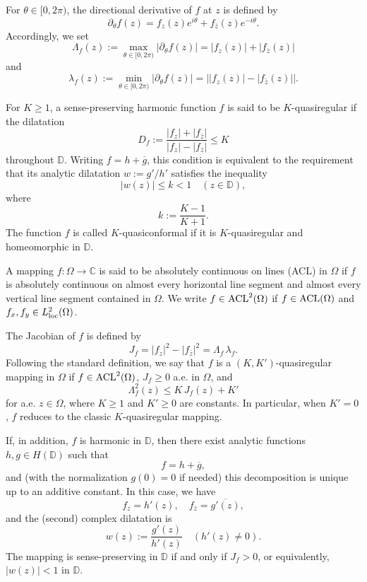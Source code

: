 \documentclass[12pt, reqno]{amsart}
\begin{document}
For $\theta\in[0,2\pi)$, the directional derivative of $f$ at $z$ is defined by
\[
\partial_\theta f(z)
= f_z(z)e^{i\theta}+f_{\bar z}(z)e^{-i\theta}.
\]
Accordingly, we set
\[
\Lambda_f(z):=\max_{\theta\in[0,2\pi)}|\partial_\theta f(z)|
=|f_z(z)|+|f_{\bar z}(z)|
\]
and
\[\lambda_f(z):=\min_{\theta\in[0,2\pi)}|\partial_\theta f(z)|
=\bigl||f_z(z)|-|f_{\bar z}(z)|\bigr|.\]

For $K\ge 1$, a sense-preserving harmonic function $f$ is said to be $K$-quasiregular if the
dilatation
\[
D_f:=\frac{|f_{z}|+|f_{\bar z}|}{|f_{z}|-|f_{\bar z}|}\le K
\]
throughout $\mathbb{D}$. Writing $f=h+\overline{g}$, this condition is equivalent to the requirement that its analytic dilatation $w:={g'}/{h'}$ satisfies the inequality
\[
|w(z)|\le k<1 \quad (z\in\mathbb{D}),
\]
where
\begin{equation}\label{kandK}
k:=\frac{K-1}{K+1}.
\end{equation}
The function $f$ is called $K$-quasiconformal if it is $K$-quasiregular and homeomorphic in
$\mathbb{D}$. 




A mapping $f:\Omega\to\mathbb C$ is said to be absolutely continuous on lines (ACL) in $\Omega$
if $f$ is absolutely continuous on almost every horizontal line segment and almost every vertical
line segment contained in $\Omega$. We write $f\in {\rm ACL}^2(\Omega)$ if $f\in {\rm ACL}(\Omega)$ and
$f_x,f_y\in L^2_{\rm loc}(\Omega)$.

The Jacobian of $f$ is defined by
\[
J_f = |f_z|^2-|f_{\bar z}|^2 = \Lambda_f\,\lambda_f.
\]
Following the standard definition, we say that $f$ is a {$(K,K')$-quasiregular mapping} in $\Omega$
if $f\in {\rm ACL}^2(\Omega)$, $J_f\ge 0$ a.e. in $\Omega$, and
\[
\Lambda^2_f(z)\le K\,J_f(z)+K'
\] 
for a.e. $z\in\Omega$,
where $K\ge 1$ and $K'\ge 0$ are constants.
In particular, when $K'=0$, $f$ reduces to the classic {$K$-quasiregular} mapping.

If, in addition, $f$ is harmonic in $\mathbb D$, then there exist analytic functions $h,g\in H(\mathbb D)$
such that
\[
f=h+\overline g,
\]
and (with the normalization $g(0)=0$ if needed) this decomposition is unique up to an additive constant.
In this case, we have
\[
f_z=h'(z),\quad f_{\bar z}=\overline{g'(z)},
\]
and the (second) complex dilatation is
\[
w(z):=\frac{g'(z)}{h'(z)}\quad (h'(z)\neq 0).
\]
The mapping is sense-preserving in $\mathbb D$ if and only if $J_f>0$, %
or equivalently, $|w(z)|<1$ in $\mathbb D$.
\end{document}

